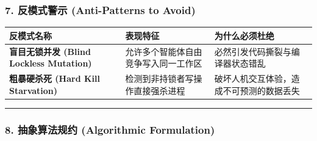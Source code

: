 \subsubsection{7. 反模式警示 (Anti-Patterns to
Avoid)}\label{ux53cdux6a21ux5f0fux8b66ux793a-anti-patterns-to-avoid-10}

{\def\LTcaptype{} %
\begin{longtable}[]{@{}
  >{\raggedright\arraybackslash}p{}
  >{\raggedright\arraybackslash}p{}
  >{\raggedright\arraybackslash}p{}@{}}
\toprule\noalign{}
\begin{minipage}[b]{\linewidth}\raggedright
反模式名称
\end{minipage} & \begin{minipage}[b]{\linewidth}\raggedright
表现特征
\end{minipage} & \begin{minipage}[b]{\linewidth}\raggedright
为什么必须杜绝
\end{minipage} \\
\midrule\noalign{}
\endhead
\bottomrule\noalign{}
\endlastfoot
\textbf{盲目无锁并发 (Blind Lockless Mutation)} &
允许多个智能体自由竞争写入同一工作区 &
必然引发代码撕裂与编译器状态错乱 \\
\textbf{粗暴硬杀死 (Hard Kill Starvation)} &
检测到非持锁者写操作直接强杀进程 &
破坏人机交互体验，造成不可预测的数据丢失 \\
\end{longtable}
}

\begin{center}\rule{0.5\linewidth}{0.5pt}\end{center}

\subsubsection{8. 抽象算法规约 (Algorithmic
Formulation)}\label{ux62bdux8c61ux7b97ux6cd5ux89c4ux7ea6-algorithmic-formulation-9}

